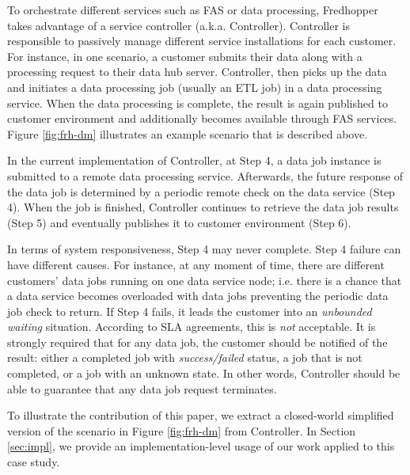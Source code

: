To orchestrate different services such as FAS or data processing, Fredhopper takes advantage of a service controller (a.k.a. Controller).
Controller is responsible to passively manage different service installations for each customer.
For instance, in one scenario, a customer submits their data along with a processing request to their data hub server.
Controller, then picks up the data and initiates a data processing job (usually an ETL job) in a data processing service.
When the data processing is complete, the result is again published to customer environment and additionally becomes available through FAS services.
Figure \ref{fig:frh-dm} illustrates an example scenario that is described above.

In the current implementation of Controller, at Step 4, a data job instance is submitted to a remote data processing service.
Afterwards, the future response of the data job is determined by a periodic remote check on the data service (Step 4). 
When the job is finished, Controller continues to retrieve the data job results (Step 5) and eventually publishes it to customer environment (Step 6).

In terms of system responsiveness, Step 4 may never complete. 
Step 4 failure can have different causes. 
For instance, at any moment of time, there are different customers' data jobs running on one data service node;
i.e. there is a chance that a data service becomes overloaded with data jobs preventing the periodic data job check to return.
If Step 4 fails, it leads the customer into an \emph{unbounded waiting} situation.
According to SLA agreements, this is \emph{not} acceptable.
It is strongly required that for any data job, the customer should be notified of the result: either a completed job with \textsl{success/failed} status, a job that is not completed, or a job with an unknown state.
In other words, Controller should be able to guarantee that any data job request terminates.

To illustrate the contribution of this paper, we extract a closed-world simplified version of the scenario in Figure \ref{fig:frh-dm} from Controller.
In Section \ref{sec:impl}, we provide an implementation-level usage of our work applied to this case study.

